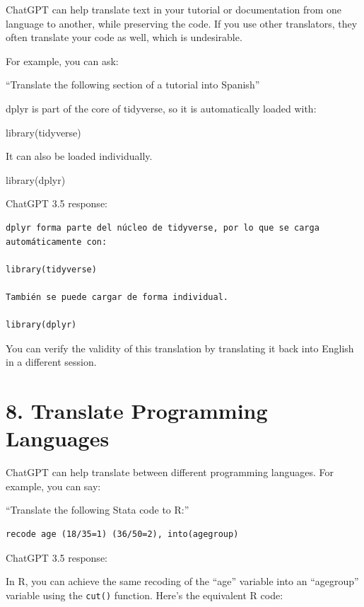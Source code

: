 \documentclass[
  letterpaper,
  DIV=11,
  numbers=noendperiod]{scrreprt}
\newenvironment{Shaded}{\begin{snugshade}}{\end{snugshade}}
\newcommand{\FunctionTok}[1]{\textcolor[rgb]{0.28,0.35,0.67}{#1}}
\newcommand{\NormalTok}[1]{\textcolor[rgb]{0.00,0.23,0.31}{#1}}
\newcommand{\SpecialCharTok}[1]{\textcolor[rgb]{0.37,0.37,0.37}{#1}}
\begin{document}
ChatGPT can help translate text in your tutorial or documentation from
one language to another, while preserving the code. If you use other
translators, they often translate your code as well, which is
undesirable.

For example, you can ask:

``Translate the following section of a tutorial into Spanish''

\begin{Shaded}
\begin{Highlighting}[]
\NormalTok{dplyr is part of the core of tidyverse, so it is automatically loaded with}\SpecialCharTok{:}

\FunctionTok{library}\NormalTok{(tidyverse)}

\NormalTok{It can also be loaded individually.}

\FunctionTok{library}\NormalTok{(dplyr)}
\end{Highlighting}
\end{Shaded}

ChatGPT 3.5 response:

\label{chatgpt}
\begin{verbatim}
dplyr forma parte del núcleo de tidyverse, por lo que se carga automáticamente con:

library(tidyverse)

También se puede cargar de forma individual.

library(dplyr)
\end{verbatim}

You can verify the validity of this translation by translating it back
into English in a different session.

\section{8. Translate Programming
Languages}\label{translate-programming-languages}

ChatGPT can help translate between different programming languages. For
example, you can say:

``Translate the following Stata code to R:''

\begin{verbatim}
recode age (18/35=1) (36/50=2), into(agegroup)
\end{verbatim}

ChatGPT 3.5 response:

\label{chatgpt}
In R, you can achieve the same recoding of the ``age'' variable into an
``agegroup'' variable using the \texttt{cut()} function. Here's the
equivalent R code:
\end{document}
